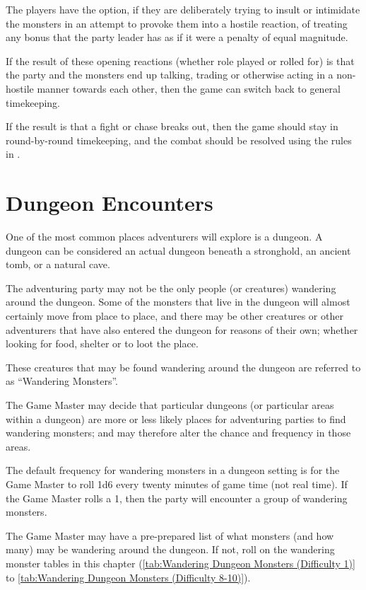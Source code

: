 \begin{multicols*}{2}
The players have the option, if they are deliberately trying to insult or intimidate the monsters in an attempt to provoke them into a hostile reaction, of treating any  bonus that the party leader has as if it were a penalty of equal magnitude.

If the result of these opening reactions (whether role played or rolled for) is that the party and the monsters end up talking, trading or otherwise acting in a non-hostile manner towards each other, then the game can switch back to general timekeeping.

If the result is that a fight or chase breaks out, then the game should stay in round-by-round timekeeping, and the combat should be resolved using the rules in .

\section{Dungeon Encounters}
One of the most common places adventurers will explore is a dungeon. A dungeon can be considered an actual dungeon beneath a stronghold, an ancient tomb, or a natural cave.

The adventuring party may not be the only people (or creatures) wandering around the dungeon. Some of the monsters that live in the dungeon will almost certainly move from place to place, and there may be other creatures or other adventurers that have also entered the dungeon for reasons of their own; whether looking for food, shelter or to loot the place.

These creatures that may be found wandering around the dungeon are referred to as “Wandering Monsters”.

The Game Master may decide that particular dungeons (or particular areas within a dungeon) are more or less likely places for adventuring parties to find wandering monsters; and may therefore alter the chance and frequency in those areas.

The default frequency for wandering monsters in a dungeon setting is for the Game Master to roll 1d6 every twenty minutes of game time (not real time). If the Game Master rolls a 1, then the party will encounter a group of wandering monsters.

The Game Master may have a pre-prepared list of what monsters (and how many) may be wandering around the dungeon. If not, roll on the wandering monster tables in this chapter (\autoref*{tab:Wandering Dungeon Monsters (Difficulty 1)} to \autoref*{tab:Wandering Dungeon Monsters (Difficulty 8-10)}).


\end{multicols*}
